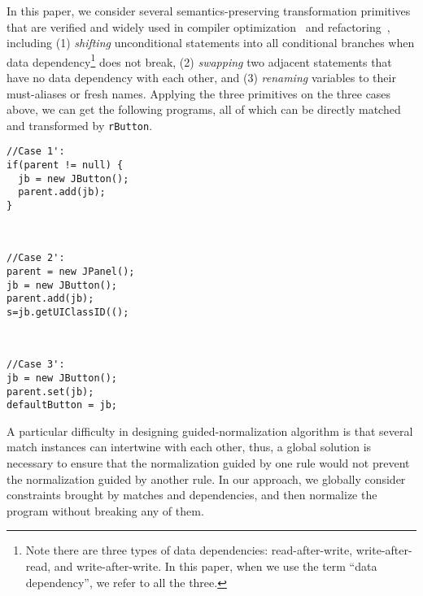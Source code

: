 \documentclass[letterpaper, USenglish]{lipics-v2016}
\newenvironment{smpage}[1]
{\begin{lrbox}{\fmbox}\begin{minipage}{#1}}
{\end{minipage}\end{lrbox}\usebox{\fmbox}}
\newcommand{\code}[1]{\texttt{\footnotesize #1}}
\theoremstyle{plain}
\begin{document}
In this paper, we consider several semantics-preserving transformation primitives that are verified and widely used in compiler optimization~\cite{Wegman:1991:CPC:103135.103136,Aho:2006:CPT:1177220,Callahan:1986:ICP:12276.13327,DBLP:conf/sefm/KanadeSK06} and  refactoring~\cite{Schafer:2008:SER:1449764.1449787,Opdyke:1992:ROF:169783,Roberts:1999:PAR:929806}, including (1) \emph{shifting} unconditional statements into
all conditional branches when data dependency\footnote{Note there are three types of data dependencies:
  read-after-write, write-after-read, and write-after-write. In this
  paper, when we use the term ``data dependency'', we refer to all the three.} does not break, (2)
\emph{swapping} two adjacent statements that have no data
dependency
with each other, and (3) \emph{renaming} variables to their
must-aliases or fresh names.  Applying the three primitives
on the three cases above, we can get the following
programs, all of which can be directly matched and transformed by \code{rButton}.
\begin{center}
\begin{smpage}{0.3\columnwidth}
\begin{lstlisting}[style=patl,frame=none,numbers=none, basicstyle=\scriptsize\ttfamily]
//Case 1':
if(parent != null) {
  jb = new JButton();
  parent.add(jb);
}
\end{lstlisting}
\end{smpage}
~~
\begin{smpage}{0.3\columnwidth}
\begin{lstlisting}[style=patl,frame=none,numbers=none, basicstyle=\scriptsize\ttfamily]
//Case 2':
parent = new JPanel();
jb = new JButton();
parent.add(jb);
s=jb.getUIClassID(();
\end{lstlisting}
\end{smpage}
~~
\begin{smpage}{0.3\columnwidth}
\begin{lstlisting}[style=patl,frame=none,numbers=none, basicstyle=\scriptsize\ttfamily]
//Case 3':
jb = new JButton();
parent.set(jb);
defaultButton = jb;
\end{lstlisting}
\end{smpage}
\end{center}

A particular difficulty in designing guided-normalization algorithm is that several match
instances can intertwine with each other, thus, a global solution is necessary to ensure that the normalization guided by one rule would not prevent the normalization guided by another rule. In our approach, we globally consider constraints brought by matches and dependencies, and then normalize the program without breaking any of them.
\end{document}
